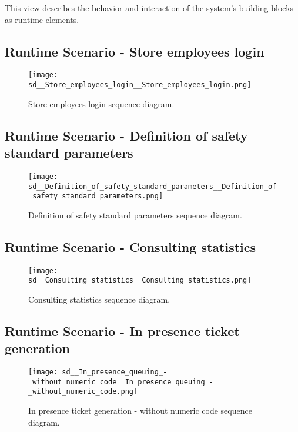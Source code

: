 \documentclass[../../main.tex]{subfiles}
\begin{document}
This view describes the behavior and interaction of the system’s building blocks as runtime elements.


\subsection{Runtime Scenario  - Store employees login}

\begin{figure}[H]
    \centering
    \texttt{[image: sd\_\_Store\_employees\_login\_\_Store\_employees\_login.png]}
    \caption{
        Store employees login sequence diagram.
    }
\end{figure}

\subsection{Runtime Scenario  - Definition of safety standard parameters}
\begin{figure}[H]
    \centering
    \texttt{[image: sd\_\_Definition\_of\_safety\_standard\_parameters\_\_Definition\_of\_safety\_standard\_parameters.png]}
    \caption{
        Definition of safety standard parameters sequence diagram.
    }
\end{figure}


\subsection{Runtime Scenario  - Consulting statistics}
\begin{figure}[H]
    \centering
    \texttt{[image: sd\_\_Consulting\_statistics\_\_Consulting\_statistics.png]}
    \caption{
        Consulting statistics sequence diagram.
    }
\end{figure}


\subsection{Runtime Scenario  - In presence ticket generation}
\begin{figure}[H]
    \centering
    \texttt{[image: sd\_\_In\_presence\_queuing\_-\_without\_numeric\_code\_\_In\_presence\_queuing\_-\_without\_numeric\_code.png]}
    \caption{
        In presence ticket generation - without numeric code sequence diagram.
    }
\end{figure}
\end{document}
